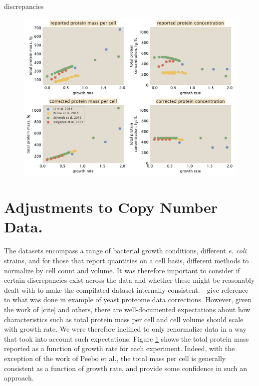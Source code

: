 discrepancies \documentclass[11pt, letterpaper]{article}
\begin{document}
\begin{figure}[H]
		\centering
    \includegraphics[width=1\textwidth]{../../figures/dataset_corrections.pdf}
  \caption{}
  \label{fig:dataset_correlations}
\end{figure}


\section{Adjustments to Copy Number Data.}



The datasets encompass a range of bacterial growth conditions,  different {\it
e. coli} strains, and for those that report quantities on a cell basis,
different methods to normalize  by  cell count and volume. It was therefore
important to consider if certain discrepancies exist across the data and whether
these might be reasonably dealt with to make the compilated dataset internally
consistent. - give reference to what was done in example of yeast proteome data
corrections. However, given the work of [cite] and others, there are
well-documented expectations about how characteristics such as total protein
mass per cell and cell volume  should scale with growth rate. We were therefore
inclined to only renormalize data in a  way  that took into account such
expectations. Figure \ref{} shows the total protein  mass reported as a function
of growth rate for each experiment. Indeed, with the exception of the work of
Peebo et al., the total mass per cell is generally consistent as a function of
growth rate, and provide some confidence in such an approach.
\end{document}
